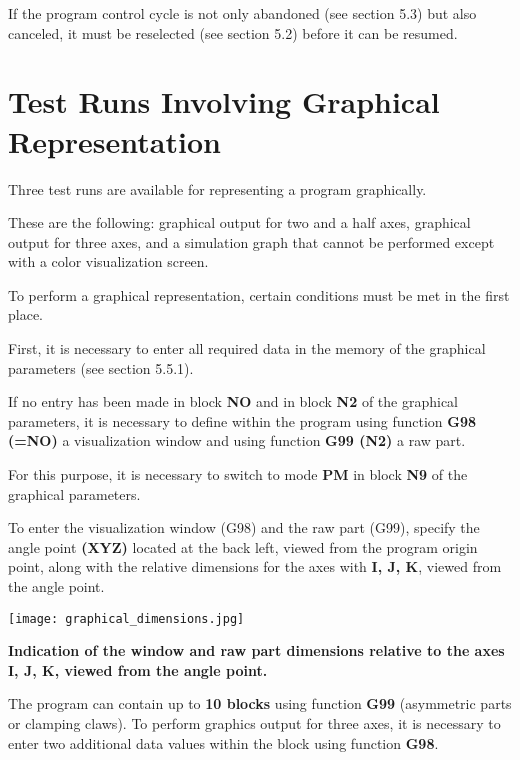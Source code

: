 \notes

If the program control cycle is not only abandoned (see section 5.3) but also canceled, it must be reselected (see section 5.2) before it can be resumed.

\newpage

\section{Test Runs Involving Graphical Representation}

Three test runs are available for representing a program graphically.

These are the following: graphical output for two and a half axes, graphical output for three axes, and a simulation graph that cannot be performed except with a color visualization screen.

To perform a graphical representation, certain conditions must be met in the first place.

First, it is necessary to enter all required data in the memory of the graphical parameters (see section 5.5.1).

If no entry has been made in block \textbf{NO} and in block \textbf{N2} of the graphical parameters, it is necessary to define within the program using function \textbf{G98 (=NO)} a visualization window and using function \textbf{G99 (N2)} a raw part.

For this purpose, it is necessary to switch to mode \textbf{PM} in block \textbf{N9} of the graphical parameters.

To enter the visualization window (G98) and the raw part (G99), specify the angle point \textbf{(XYZ)} located at the back left, viewed from the program origin point, along with the relative dimensions for the axes with \textbf{I, J, K}, viewed from the angle point.

\begin{center}
    \texttt{[image: graphical\_dimensions.jpg]}
\end{center}

\textbf{Indication of the window and raw part dimensions relative to the axes I, J, K, viewed from the angle point.}


The program can contain up to \textbf{10 blocks} using function \textbf{G99} (asymmetric parts or clamping claws).  
To perform graphics output for three axes, it is necessary to enter two additional data values within the block using function \textbf{G98}.

